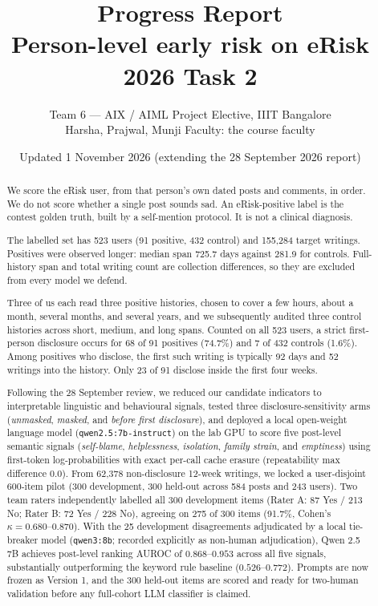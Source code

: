 \documentclass[11pt,a4paper]{article}
\title{\textbf{Progress Report}\\Person-level early risk on eRisk 2026 Task 2}
\author{Team 6 --- AIX / AIML Project Elective, IIIT Bangalore\\Harsha, Prajwal, Munji \quad Faculty: the course faculty}
\date{Updated 1 November 2026 (extending the 28 September 2026 report)}
\begin{document}
\maketitle

\begin{abstract}
We score the eRisk user, from that person's own dated posts and comments, in order. We do not score whether a single post sounds sad. An eRisk-positive label is the contest golden truth, built by a self-mention protocol. It is not a clinical diagnosis.

The labelled set has 523 users (91 positive, 432 control) and 155,284 target writings. Positives were observed longer: median span 725.7 days against 281.9 for controls. Full-history span and total writing count are collection differences, so they are excluded from every model we defend.

Three of us each read three positive histories, chosen to cover a few hours, about a month, several months, and several years, and we subsequently audited three control histories across short, medium, and long spans. Counted on all 523 users, a strict first-person disclosure occurs for 68 of 91 positives (74.7\%) and 7 of 432 controls (1.6\%). Among positives who disclose, the first such writing is typically 92 days and 52 writings into the history. Only 23 of 91 disclose inside the first four weeks.

Following the 28 September review, we reduced our candidate indicators to interpretable linguistic and behavioural signals, tested three disclosure-sensitivity arms (\emph{unmasked}, \emph{masked}, and \emph{before first disclosure}), and deployed a local open-weight language model (\texttt{qwen2.5:7b-instruct}) on the lab GPU to score five post-level semantic signals (\emph{self-blame}, \emph{helplessness}, \emph{isolation}, \emph{family strain}, and \emph{emptiness}) using first-token log-probabilities with exact per-call cache erasure (repeatability max difference $0.0$). From 62,378 non-disclosure 12-week writings, we locked a user-disjoint 600-item pilot (300 development, 300 held-out across 584 posts and 243 users). Two team raters independently labelled all 300 development items (Rater A: 87 Yes / 213 No; Rater B: 72 Yes / 228 No), agreeing on 275 of 300 items (91.7\%, Cohen's $\kappa = 0.680$--$0.870$). With the 25 development disagreements adjudicated by a local tie-breaker model (\texttt{qwen3:8b}; recorded explicitly as non-human adjudication), Qwen 2.5 7B achieves post-level ranking AUROC of $0.868$--$0.953$ across all five signals, substantially outperforming the keyword rule baseline ($0.526$--$0.772$). Prompts are now frozen as Version 1, and the 300 held-out items are scored and ready for two-human validation before any full-cohort LLM classifier is claimed.
\end{abstract}
\end{document}

